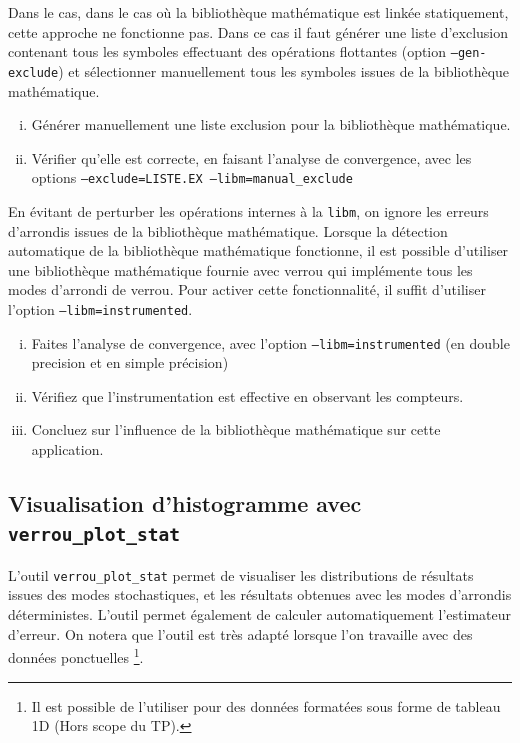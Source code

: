 \documentclass[a4paper]{article}
\newcounter{Question}
\newenvironment{question}[1][\unskip]{
  \bigskip
  \stepcounter{Question}
  \def\questionTitle{ #1}
  \begin{mdframed}[style=question]
  }{
  \end{mdframed}
}
\begin{document}
Dans le cas, dans le cas où la bibliothèque mathématique est linkée statiquement, cette approche ne fonctionne pas. Dans ce cas
il faut générer une liste d'exclusion contenant tous les symboles effectuant des opérations flottantes (option \texttt{--gen-exclude})
et sélectionner manuellement tous les symboles issues de la bibliothèque mathématique.


\begin{question}
  \begin{enumerate}[(i)]
  \item Générer manuellement une liste exclusion pour la bibliothèque mathématique.
  \item Vérifier qu'elle est correcte, en faisant l'analyse de convergence, avec les options \texttt{--exclude=LISTE.EX  --libm=manual\_exclude}
  \end{enumerate}
\end{question}

\bigskip
En évitant de perturber les opérations internes à la
\texttt{libm}, on ignore les erreurs d'arrondis issues de la
bibliothèque mathématique. Lorsque la détection automatique de la
bibliothèque mathématique fonctionne, il est possible d'utiliser une
bibliothèque mathématique fournie avec verrou qui implémente tous les
modes d'arrondi de verrou. Pour activer cette fonctionnalité, il
suffit d'utiliser l'option \texttt{--libm=instrumented}. 


\begin{question}
  \begin{enumerate}[(i)]
  \item Faites l'analyse de convergence, avec l'option \texttt{--libm=instrumented} (en double precision et en simple précision)
  \item Vérifiez que l'instrumentation est effective en observant les compteurs.
  \item Concluez sur l'influence de la bibliothèque mathématique sur cette application.
  \end{enumerate}
\end{question}




\subsection{Visualisation d'histogramme avec \texttt{verrou\_plot\_stat}}
\label{ref:plotStat}

L'outil \texttt{verrou\_plot\_stat} permet de visualiser les
distributions de résultats issues des modes stochastiques, et les
résultats obtenues avec les modes d'arrondis déterministes. L'outil
permet également de calculer automatiquement l'estimateur d'erreur. On
notera que l'outil est très adapté lorsque l'on travaille avec des
données ponctuelles \footnote{Il est possible de l'utiliser pour des données
formatées sous forme de tableau 1D (Hors scope du TP).}. 
\end{document}
